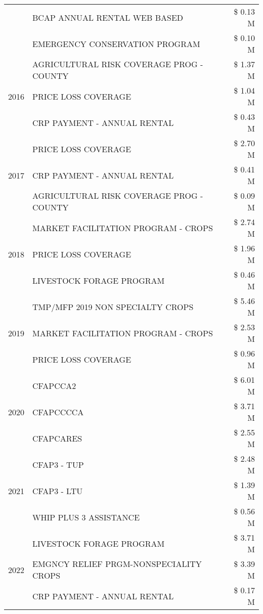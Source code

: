 \begin{tabular}{llr}
 & BCAP ANNUAL RENTAL WEB BASED & \$ 0.13 M \\
 & EMERGENCY CONSERVATION PROGRAM & \$ 0.10 M \\
\cline{1-3}
\multirow[t]{3}{*}{2016} & AGRICULTURAL RISK COVERAGE PROG - COUNTY & \$ 1.37 M \\
 & PRICE LOSS COVERAGE & \$ 1.04 M \\
 & CRP PAYMENT - ANNUAL RENTAL & \$ 0.43 M \\
\cline{1-3}
\multirow[t]{3}{*}{2017} & PRICE LOSS COVERAGE & \$ 2.70 M \\
 & CRP PAYMENT - ANNUAL RENTAL & \$ 0.41 M \\
 & AGRICULTURAL RISK COVERAGE PROG - COUNTY & \$ 0.09 M \\
\cline{1-3}
\multirow[t]{3}{*}{2018} & MARKET FACILITATION PROGRAM - CROPS & \$ 2.74 M \\
 & PRICE LOSS COVERAGE & \$ 1.96 M \\
 & LIVESTOCK FORAGE PROGRAM & \$ 0.46 M \\
\cline{1-3}
\multirow[t]{3}{*}{2019} & TMP/MFP 2019 NON SPECIALTY CROPS & \$ 5.46 M \\
 & MARKET FACILITATION PROGRAM - CROPS & \$ 2.53 M \\
 & PRICE LOSS COVERAGE & \$ 0.96 M \\
\cline{1-3}
\multirow[t]{3}{*}{2020} & CFAPCCA2 & \$ 6.01 M \\
 & CFAPCCCCA & \$ 3.71 M \\
 & CFAPCARES & \$ 2.55 M \\
\cline{1-3}
\multirow[t]{3}{*}{2021} & CFAP3 - TUP & \$ 2.48 M \\
 & CFAP3 - LTU & \$ 1.39 M \\
 & WHIP PLUS 3 ASSISTANCE & \$ 0.56 M \\
\cline{1-3}
\multirow[t]{3}{*}{2022} & LIVESTOCK FORAGE PROGRAM & \$ 3.71 M \\
 & EMGNCY RELIEF PRGM-NONSPECIALITY CROPS & \$ 3.39 M \\
 & CRP PAYMENT - ANNUAL RENTAL & \$ 0.17 M \\
\cline{1-3}
\bottomrule
\end{tabular}
